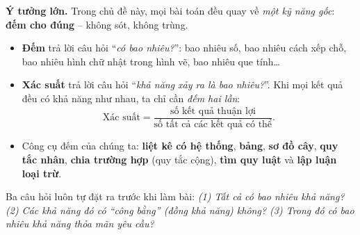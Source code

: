 \providecommand{\cpSpinSix}[6]{%
  \foreach \a in {90,150,210,270,330,30}{\draw[Ink,line width=0.8pt] (0,0)--(\a:1.1);}
  \draw[Ink,line width=1pt] (0,0) circle (1.1);
  \node[font=\itshape\large] at (120:0.72){#1};
  \node[font=\itshape\large] at (60:0.72){#2};
  \node[font=\itshape\large] at (0:0.72){#3};
  \node[font=\itshape\large] at (-60:0.72){#4};
  \node[font=\itshape\large] at (-120:0.72){#5};
  \node[font=\itshape\large] at (180:0.72){#6};
  \draw[-{Stealth[length=7pt]},line width=1.6pt,Ink] (0,0)--(250:0.98);
  \fill[Ink] (0,0) circle (1.6pt);}
\providecommand{\cpOct}[2]{%
  \draw[Ink,line width=0.8pt,fill=tmBlue!8] (#1-0.2071,#2+0.5)--(#1+0.2071,#2+0.5)--(#1+0.5,#2+0.2071)--(#1+0.5,#2-0.2071)
     --(#1+0.2071,#2-0.5)--(#1-0.2071,#2-0.5)--(#1-0.5,#2-0.2071)--(#1-0.5,#2+0.2071)--cycle;}
\providecommand{\cpDia}[2]{%
  \draw[Ink,line width=0.8pt,fill=tmOrange!35] (#1,#2+0.2929)--(#1+0.2929,#2)--(#1,#2-0.2929)--(#1-0.2929,#2)--cycle;}
\providecommand{\rvcaBall}[3]{\filldraw[fill=#3!55,draw=#3!75!black,line width=0.7pt] (#1,#2) circle (0.22);}

\begin{knowbox}
\textbf{Ý tưởng lớn.} Trong chủ đề này, mọi bài toán đều quay về \emph{một kỹ năng gốc}: \textbf{đếm cho đúng} -- không sót, không trùng.
\begin{itemize}[leftmargin=1.2em,itemsep=1pt,topsep=2pt]
\item \textbf{Đếm} trả lời câu hỏi ``\emph{có bao nhiêu?}'': bao nhiêu số, bao nhiêu cách xếp chỗ, bao nhiêu hình chữ nhật trong hình vẽ, bao nhiêu que tính\ldots
\item \textbf{Xác suất} trả lời câu hỏi ``\emph{khả năng xảy ra là bao nhiêu?}''. Khi mọi kết quả đều có khả năng như nhau, ta chỉ cần \emph{đếm hai lần}:
\[
\text{Xác suất}=\frac{\text{số kết quả thuận lợi}}{\text{số tất cả các kết quả có thể}} .
\]
\item Công cụ đếm của chúng ta: \textbf{liệt kê có hệ thống}, \textbf{bảng}, \textbf{sơ đồ cây}, \textbf{quy tắc nhân}, \textbf{chia trường hợp} (quy tắc cộng), \textbf{tìm quy luật} và \textbf{lập luận loại trừ}.
\end{itemize}
Ba câu hỏi luôn tự đặt ra trước khi làm bài: \emph{(1) Tất cả có bao nhiêu khả năng? (2) Các khả năng đó có ``công bằng'' (đồng khả năng) không? (3) Trong đó có bao nhiêu khả năng thỏa mãn yêu cầu?}
\end{knowbox}

